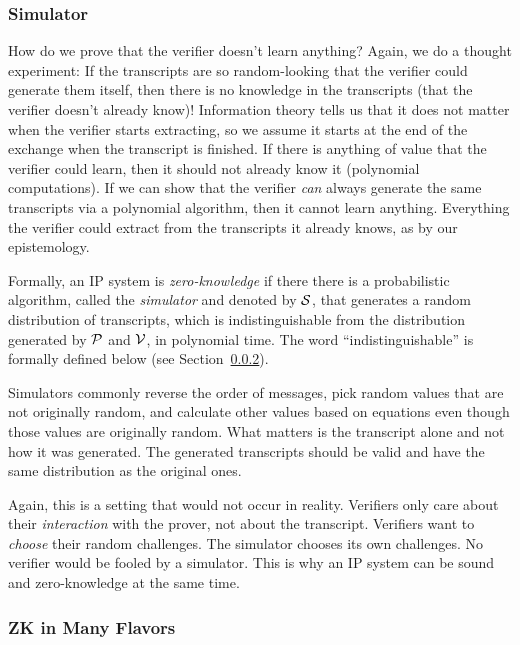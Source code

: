 \subsubsection{Simulator}

How do we prove that the verifier doesn't learn anything?
Again, we do a thought experiment:
%
If the transcripts are so random-looking that the verifier could generate them itself,
then there is no knowledge in the transcripts (that the verifier doesn't already know)!
%
Information theory tells us that it does not matter when the verifier starts extracting,
so we assume it starts at the end of the exchange when the transcript is finished.
%
If there is anything of value that the verifier could learn,
then it should not already know it (polynomial computations).
If we can show that the verifier \emph{can} always generate the same transcripts via a polynomial algorithm,
then it cannot learn anything.
Everything the verifier could extract from the transcripts it already knows,
as by our epistemology.

Formally,
an IP system is \emph{zero-knowledge} if there there is a probabilistic algorithm,
called the \emph{simulator} and denoted by $\mathcal{S}$,
that generates a random distribution of transcripts,
which is indistinguishable from the distribution generated by $\mathcal{P}$ and $\mathcal{V}$,
in polynomial time.
The word \enquote{indistinguishable} is formally defined below (see Section~\ref{ssec:zk-flavors}).

Simulators commonly reverse the order of messages,
pick random values that are not originally random,
and calculate other values based on equations even though those values are originally random.
What matters is the transcript alone and not how it was generated.
The generated transcripts should be valid and have the same distribution as the original ones.

Again,
this is a setting that would not occur in reality.
Verifiers only care about their \emph{interaction} with the prover,
not about the transcript.
Verifiers want to \emph{choose} their random challenges.
The simulator chooses its own challenges.
No verifier would be fooled by a simulator.
This is why an IP system can be sound and zero-knowledge at the same time.

\subsubsection{ZK in Many Flavors}%
\label{ssec:zk-flavors}

